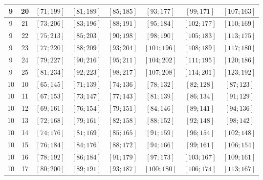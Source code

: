 \documentclass[a4paper,12pt]{article}
\begin{document}
\begin{center}
{\begin{longtable}[H]{|c|c|c|c|c|c|c|c|}
9 &  20 &  $\left[ 71; 199\right]$ &  $\left[ 81; 189\right]$ &  $\left[ 85; 185\right]$ &  $\left[ 93; 177\right]$ &  $\left[ 99; 171\right]$ &  $\left[ 107; 163\right]$ \tabularnewline \hline
9 &  21 &  $\left[ 73; 206\right]$ &  $\left[ 83; 196\right]$ &  $\left[ 88; 191\right]$ &  $\left[ 95; 184\right]$ &  $\left[ 102; 177\right]$ &  $\left[ 110; 169\right]$ \tabularnewline \hline
9 &  22 &  $\left[ 75; 213\right]$ &  $\left[ 85; 203\right]$ &  $\left[ 90; 198\right]$ &  $\left[ 98; 190\right]$ &  $\left[ 105; 183\right]$ &  $\left[ 113; 175\right]$ \tabularnewline \hline
9 &  23 &  $\left[ 77; 220\right]$ &  $\left[ 88; 209\right]$ &  $\left[ 93; 204\right]$ &  $\left[ 101; 196\right]$ &  $\left[ 108; 189\right]$ &  $\left[ 117; 180\right]$ \tabularnewline \hline
9 &  24 &  $\left[ 79; 227\right]$ &  $\left[ 90; 216\right]$ &  $\left[ 95; 211\right]$ &  $\left[ 104; 202\right]$ &  $\left[ 111; 195\right]$ &  $\left[ 120; 186\right]$ \tabularnewline \hline
9 &  25 &  $\left[ 81; 234\right]$ &  $\left[ 92; 223\right]$ &  $\left[ 98; 217\right]$ &  $\left[ 107; 208\right]$ &  $\left[ 114; 201\right]$ &  $\left[ 123; 192\right]$ \tabularnewline \hline
10 &  10 &  $\left[ 65; 145\right]$ &  $\left[ 71; 139\right]$ &  $\left[ 74; 136\right]$ &  $\left[ 78; 132\right]$ &  $\left[ 82; 128\right]$ &  $\left[ 87; 123\right]$ \tabularnewline \hline
10 &  11 &  $\left[ 67; 153\right]$ &  $\left[ 73; 147\right]$ &  $\left[ 77; 143\right]$ &  $\left[ 81; 139\right]$ &  $\left[ 86; 134\right]$ &  $\left[ 91; 129\right]$ \tabularnewline \hline
10 &  12 &  $\left[ 69; 161\right]$ &  $\left[ 76; 154\right]$ &  $\left[ 79; 151\right]$ &  $\left[ 84; 146\right]$ &  $\left[ 89; 141\right]$ &  $\left[ 94; 136\right]$ \tabularnewline \hline
10 &  13 &  $\left[ 72; 168\right]$ &  $\left[ 79; 161\right]$ &  $\left[ 82; 158\right]$ &  $\left[ 88; 152\right]$ &  $\left[ 92; 148\right]$ &  $\left[ 98; 142\right]$ \tabularnewline \hline
10 &  14 &  $\left[ 74; 176\right]$ &  $\left[ 81; 169\right]$ &  $\left[ 85; 165\right]$ &  $\left[ 91; 159\right]$ &  $\left[ 96; 154\right]$ &  $\left[ 102; 148\right]$ \tabularnewline \hline
10 &  15 &  $\left[ 76; 184\right]$ &  $\left[ 84; 176\right]$ &  $\left[ 88; 172\right]$ &  $\left[ 94; 166\right]$ &  $\left[ 99; 161\right]$ &  $\left[ 106; 154\right]$ \tabularnewline \hline
10 &  16 &  $\left[ 78; 192\right]$ &  $\left[ 86; 184\right]$ &  $\left[ 91; 179\right]$ &  $\left[ 97; 173\right]$ &  $\left[ 103; 167\right]$ &  $\left[ 109; 161\right]$ \tabularnewline \hline
10 &  17 &  $\left[ 80; 200\right]$ &  $\left[ 89; 191\right]$ &  $\left[ 93; 187\right]$ &  $\left[ 100; 180\right]$ &  $\left[ 106; 174\right]$ &  $\left[ 113; 167\right]$ \tabularnewline \hline

\end{longtable}}
\end{center}
\end{document}
